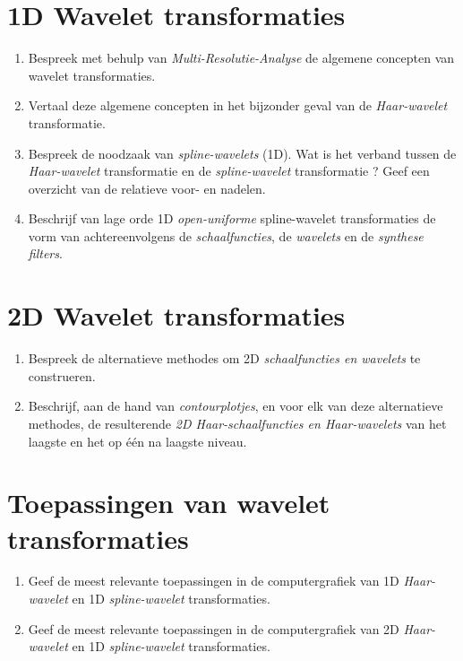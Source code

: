 \documentclass{report}
\begin{document}
	\section{1D Wavelet transformaties}
	\begin{enumerate}
		\item Bespreek met behulp van \textit{Multi-Resolutie-Analyse} de algemene concepten van wavelet transformaties. 
		
		\item Vertaal deze algemene concepten in het bijzonder geval van de \textit{Haar-wavelet} transformatie. 

		
		\item Bespreek de noodzaak van \textit{spline-wavelets} (1D). Wat is het verband tussen de \textit{Haar-wavelet} transformatie en de \textit{spline-wavelet} transformatie ? Geef een overzicht van de relatieve voor- en nadelen. 
		
		\item Beschrijf van lage orde 1D \textit{open-uniforme} spline-wavelet transformaties de vorm van achtereenvolgens de \textit{schaalfuncties}, de \textit{wavelets} en de \textit{synthese filters}.
	\end{enumerate}

	\section{2D Wavelet transformaties }
	\begin{enumerate}
		\item Bespreek de alternatieve methodes om 2D \textit{schaalfuncties en wavelets} te construeren.
		
		\item Beschrijf, aan de hand van \textit{contourplotjes}, en voor elk van deze alternatieve methodes, de resulterende \textit{2D Haar-schaalfuncties en Haar-wavelets} van het laagste en het op één na laagste niveau.
	\end{enumerate}

	\section{Toepassingen van wavelet transformaties }
	\begin{enumerate}
		\item Geef de meest relevante toepassingen in de computergrafiek van 1D \textit{Haar-wavelet} en 1D \textit{spline-wavelet} transformaties. 
		
		\item 	Geef de meest relevante toepassingen in de computergrafiek van 2D \textit{Haar-wavelet} en 1D \textit{spline-wavelet} transformaties. 
	\end{enumerate}
	
\end{document}
